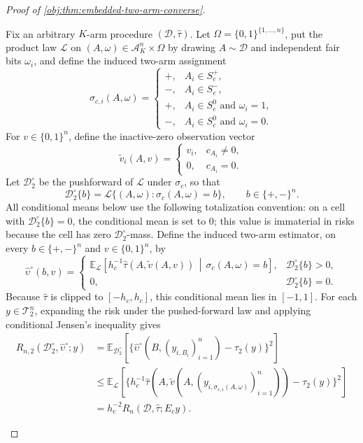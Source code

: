 \begin{proof}[Proof of \cref{obj:thm:embedded-two-arm-converse}]
\begin{enumerate}
Fix an arbitrary \(K\)-arm procedure \((\mathcal D,\widehat\tau)\). Let
\(\Omega=\{0,1\}^{\{1,\ldots,n\}}\), put the product law \(\mathcal L\) on
\((A,\omega)\in\mathcal A_K^n\times\Omega\) by drawing \(A\sim\mathcal D\) and independent fair bits
\(\omega_i\), and define the induced two-arm assignment
\[
\sigma_{c,i}(A,\omega)
=
\begin{cases}
+,&A_i\in S_c^+,\\
-,&A_i\in S_c^-,\\
+,&A_i\in S_c^0\text{ and }\omega_i=1,\\
-,&A_i\in S_c^0\text{ and }\omega_i=0.
\end{cases}
\]
For \(v\in\{0,1\}^n\), define the inactive-zero observation vector
\[
\widetilde v_i(A,v)
=
\begin{cases}
v_i,&c_{A_i}\ne0,\\
0,&c_{A_i}=0.
\end{cases}
\]
Let \(\mathcal D_2^\circ\) be the pushforward of \(\mathcal L\) under \(\sigma_c\), so that
\[
\mathcal D_2^\circ\{b\}
=
\mathcal L\{(A,\omega):\sigma_c(A,\omega)=b\},
\qquad b\in\{+,-\}^n.
\]
All conditional means below use the following totalization convention: on a cell with
\(\mathcal D_2^\circ\{b\}=0\), the conditional mean is set to \(0\); this value is immaterial in risks because the cell has zero \(\mathcal D_2^\circ\)-mass. Define the induced two-arm estimator, on every \(b\in\{+,-\}^n\) and \(v\in\{0,1\}^n\), by
\[
\widehat\upsilon^\circ(b,v)
=
\begin{cases}
\mathbb E_{\mathcal L}\!\left[
h_c^{-1}\widehat\tau(A,\widetilde v(A,v))
\,\middle|\, \sigma_c(A,\omega)=b
\right],&\mathcal D_2^\circ\{b\}>0,\\[1ex]
0,&\mathcal D_2^\circ\{b\}=0.
\end{cases}
\]
Because \(\widehat\tau\) is clipped to \([-h_c,h_c]\), this conditional mean lies in \([-1,1]\). For each \(y\in\mathcal T_2^n\), expanding the risk under the pushed-forward law and applying conditional Jensen's inequality gives
\[
\begin{aligned}
R_{n,2}(\mathcal D_2^\circ,\widehat\upsilon^\circ;y)
&=
\mathbb E_{\mathcal D_2^\circ}\!\left[
\{\widehat\upsilon^\circ(B,(y_{i,B_i})_{i=1}^n)-\tau_2(y)\}^2
\right]\\
&\le
\mathbb E_{\mathcal L}\!\left[
\{h_c^{-1}\widehat\tau(A,\widetilde v(A,(y_{i,\sigma_{c,i}(A,\omega)})_{i=1}^n))-\tau_2(y)\}^2
\right] \\
&=
h_c^{-2}
R_n(\mathcal D,\widehat\tau;E_cy).
\end{aligned}
\]
\end{enumerate}
\end{proof}

